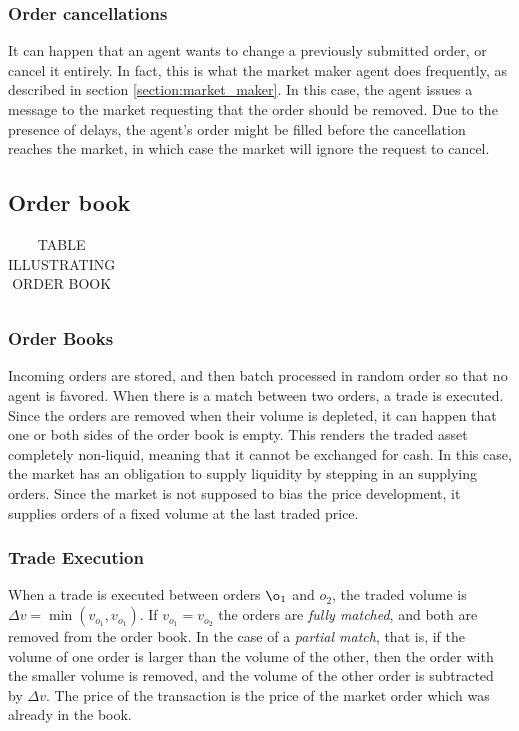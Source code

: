 \subsubsection{Order cancellations}
It can happen that an agent wants to change a previously submitted order, or cancel it entirely. In fact, this is what the market maker agent does frequently, as described in section \ref{section:market_maker}. In this case, the agent issues a message to the market requesting that the order should be removed. Due to the presence of delays, the agent's order might be filled before the cancellation reaches the market, in which case the market will ignore the request to cancel.

\subsection{Order book}

\begin{table}
\begin{tabular}{ccc}

\end{tabular}
\caption{TABLE ILLUSTRATING ORDER BOOK}\label{table:example_order_book}
\end{table}

\subsubsection{Order Books}
Incoming orders are stored, and then batch processed in random order so that no agent is favored. When there is a match between two orders, a trade is executed. Since the orders are removed when their volume is depleted, it can happen that one or both sides of the order book is empty. This renders the traded asset completely non-liquid, meaning that it cannot be exchanged for cash. In this case, the market has an obligation to supply liquidity by stepping in an supplying orders. Since the market is not supposed to bias the price development, it supplies orders of a fixed volume at the last traded price.

\subsubsection{Trade Execution}
When a trade is executed between orders $\o_1$ and $o_2$, the traded volume is $\Delta v = \min (v_{o_1}, v_{o_1})$. If $v_{o_1} = v_{o_2}$ the orders are \textit{fully matched}, and both are removed from the order book. In the case of a \textit{partial match}, that is, if the volume of one order is larger than the volume of the other, then the order with the smaller volume is removed, and the volume of the other order is subtracted by $\Delta v$. The price of the transaction is the price of the market order which was already in the book. 

